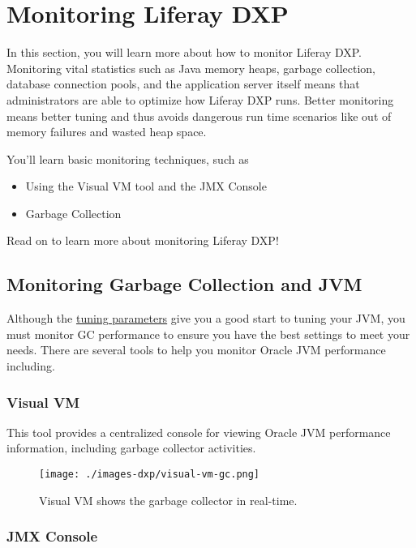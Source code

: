 \chapter{Monitoring Liferay DXP}\label{monitoring-liferay-dxp}

In this section, you will learn more about how to monitor Liferay DXP.
Monitoring vital statistics such as Java memory heaps, garbage
collection, database connection pools, and the application server itself
means that administrators are able to optimize how Liferay DXP runs.
Better monitoring means better tuning and thus avoids dangerous run time
scenarios like out of memory failures and wasted heap space.

You'll learn basic monitoring techniques, such as

\begin{itemize}
\tightlist
\item
  Using the Visual VM tool and the JMX Console
\item
  Garbage Collection
\end{itemize}

Read on to learn more about monitoring Liferay DXP!

\section{Monitoring Garbage Collection and
JVM}\label{monitoring-garbage-collection-and-jvm}

Although the
\href{/docs/7-0/deploy/-/knowledge_base/d/liferay-digital-enterprise-configuration-and-tuning-guidelines}{tuning
parameters} give you a good start to tuning your JVM, you must monitor
GC performance to ensure you have the best settings to meet your needs.
There are several tools to help you monitor Oracle JVM performance
including.

\subsection{Visual VM}\label{visual-vm}

This tool provides a centralized console for viewing Oracle JVM
performance information, including garbage collector activities.

\begin{figure}
\centering
\texttt{[image: ./images-dxp/visual-vm-gc.png]}
\caption{Visual VM shows the garbage collector in real-time.}
\end{figure}

\subsection{JMX Console}\label{jmx-console}

